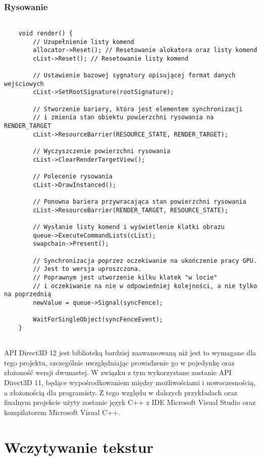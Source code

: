 \subsubsection{Rysowanie}
\begin{lstlisting}[caption={Pseudokod rysowania Direct3D 12 (oryginalna treść)}, label={lst:d3d12_render}]
	
	void render() {
		// Uzupełnienie listy komend
		allocator->Reset(); // Resetowanie alokatora oraz listy komend
		cList->Reset(); // Resetowanie listy komend
		
		// Ustawienie bazowej sygnatury opisującej format danych wejściowych	
		cList->SetRootSignature(rootSignature);
		
		// Stworzenie bariery, która jest elementem synchronizacji 
		// i zmienia stan obiektu powierzchni rysowania na RENDER_TARGET
		cList->ResourceBarrier(RESOURCE_STATE, RENDER_TARGET);
		
		// Wyczyszczenie powierzchni rysowania
		cList->ClearRenderTargetView();
		
		// Polecenie rysowania
		cList->DrawInstanced();
		
		// Ponowna bariera przywracająca stan powierzchni rysowania
		cList->ResourceBarrier(RENDER_TARGET, RESOURCE_STATE);
		
		// Wysłanie listy komend i wyświetlenie klatki obrazu
		queue->ExecuteCommandLists(cList);
		swapchain->Present();
		
		// Synchronizacja poprzez oczekiwanie na ukończenie pracy GPU.
		// Jest to wersja uproszczona. 
		// Poprawnym jest utworzenie kilku klatek "w locie"
		// i oczekiwanie na nie w odpowiedniej kolejności, a nie tylko na poprzednią
		newValue = queue->Signal(syncFence);
		
		WaitForSingleObject(syncFenceEvent);
	}
	
\end{lstlisting}

API Direct3D 12 jest biblioteką bardziej zaawansowaną niż jest to
wymagane dla tego projektu, szczególnie uwzględniając prowadzenie go w
pojedynkę oraz złożoność wersji dwunastej. W związku z tym wykorzystane
zostanie API Direct3D 11, będące wypośrodkowaniem między możliwościami i
nowoczesnością, a złożonością dla programisty. Z tego względu w dalszych
przykładach oraz finalnym projekcie użyty zostanie język C++ z IDE
Microsoft Visual Studio oraz kompilatorem Microsoft Visual C++.

\section{Wczytywanie tekstur}


